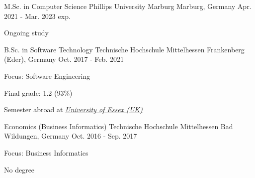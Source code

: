 

\begin{cventries}

   \cventry
      {M.Sc. in Computer Science} %
      {Phillips University Marburg} %
      {Marburg, Germany} %
      {Apr. 2021 - Mar. 2023 exp.} %
      {
          \begin{cvitems} %
              \item {Ongoing study}
          \end{cvitems}
      }
  \cventry
    {B.Sc. in Software Technology} %
    {Technische Hochschule Mittelhessen} %
    {Frankenberg (Eder), Germany} %
    {Oct. 2017 - Feb. 2021} %
    {
      \begin{cvitems} %
        \item {Focus: Software Engineering}
        \item {Final grade: 1.2 (93\%)}
        \item {Semester abroad at \textit{\href{https://www.essex.ac.uk/}{University of Essex (UK)}}}
      \end{cvitems}
    }

    \cventry
    {Economics (Business Informatics)} %
    {Technische Hochschule Mittelhessen} %
    {Bad Wildungen, Germany} %
    {Oct. 2016 - Sep. 2017} %
    {
        \begin{cvitems} %
            \item {Focus: Business Informatics}
            \item {No degree}
        \end{cvitems}
    }

\end{cventries}
